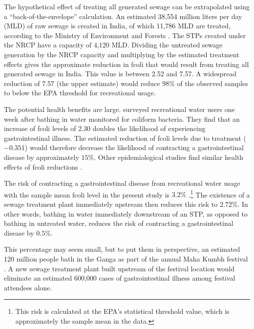 \documentclass[12pt]{article}
\renewcommand{\citet}[1]{\citeauthor{#1} \citeyearpar{#1}}
\begin{document}
The hypothetical effect of treating all generated sewage can be extrapolated using a ``back-of-the-envelope'' calculation. An estimated 38,554 million liters per day (MLD) of raw sewage is created in India, of which 11,786 MLD are treated, according to the 
Ministry of Environment and Forests \citep{kaur2012}. The STPs created under the NRCP have a capacity of 4,120 MLD. Dividing the untreated sewage generation by the NRCP capacity and multiplying by the estimated treatment effects gives the approximate reduction in fcoli that would result from treating all generated sewage in India. This value is between 2.52 and 7.57. A widespread reduction of 7.57 (the upper estimate) would reduce 98\% of the observed samples to below the EPA threshold for recreational usage. 

The potential health benefits are large. \citet{wade2010} surveyed recreational water users one week after bathing in water monitored for coliform bacteria. They find that an increase of fcoli levels of 2.30 doubles the likelihood of experiencing gastrointestinal illness. The estimated reduction of fcoli levels due to treatment ($-0.351$) would therefore decrease the likelihood of contracting a gastrointestinal disease by approximately $15\%$. Other epidemiological studies find similar health effects of fcoli reductions \citep{wiedenmann2006, colford2005, colford2007, lee1997}.

The risk of contracting a gastrointestinal disease from recreational water usage with the sample mean fcoli level in the present study is $3.2\%$ .\footnote{This risk is calculated at the EPA's statistical threshold value, which is approximately the sample mean in the data.} The existence of a sewage treatment plant immediately upstream then reduces this risk to $2.72\%$. In other words, bathing in water immediately downstream of an STP, as opposed to bathing in untreated water, reduces the risk of contracting a gastrointestinal disease by $0.5\%$.

This percentage may seem small, but to put them in perspective, an estimated 120 million people bath in the Ganga as part of the annual Maha Kumbh festival \citep{khaleej2013}. A new sewage treatment plant built upstream of the festival location would eliminate an estimated 600,000 cases of gastrointestinal illness among festival attendees alone. 
\end{document}
